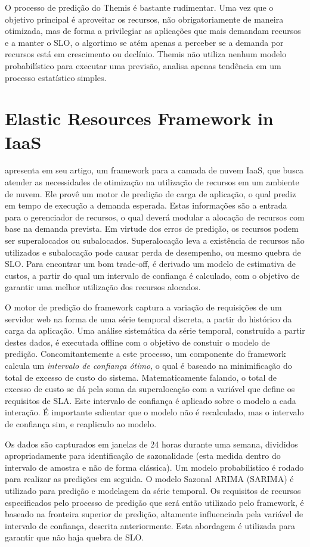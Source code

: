 \documentclass[twoside,english,brazilian]{UNISINOSmonografia}
\begin{document}
O processo de predição do Themis é bastante rudimentar. Uma vez que o objetivo principal é aproveitar os recursos, não obrigatoriamente de maneira otimizada, mas de forma a privilegiar as aplicações que mais demandam recursos e a manter o SLO, o algortimo se atém apenas a perceber se a demanda por recursos está em crescimento ou declínio. Themis não utiliza nenhum modelo probabilístico para executar uma previsão, analisa apenas tendência em um processo estatístico simples.


\section{Elastic Resources Framework in IaaS}
\cite{Dhingra2013} apresenta em seu artigo, um framework para a camada de nuvem IaaS, que busca atender as necessidades de otimização na utilização de recursos em um ambiente de nuvem. Ele provê um motor de predição de carga de aplicação, o qual prediz em tempo de execução a demanda esperada. Estas informações são a entrada para o gerenciador de recursos, o qual deverá modular a alocação de recursos com base na demanda prevista. Em virtude dos erros de predição, os recursos podem ser superalocados ou subalocados. Superalocação leva a existência de recursos não utilizados e subalocação pode causar perda de desempenho, ou mesmo quebra de SLO. Para encontrar um bom trade-off, é derivado um modelo de estimativa de custos, a partir do qual um intervalo de confiança é calculado, com o objetivo de garantir uma melhor utilização dos recursos alocados.

O motor de predição do framework captura a variação de requisições de um servidor web na forma de uma série temporal discreta, a partir do histórico da carga da aplicação. Uma análise sistemática da série temporal, construída a partir destes dados, é executada offline com o objetivo de constuir o modelo de predição. Concomitantemente a este processo, um componente do framework calcula um \textit{intervalo de confiança ótimo}, o qual é baseado na minimificação do total de excesso de custo do sistema. Matematicamente falando, o total de excesso de custo se dá pela soma da superalocação com a variável que define os requisitos de SLA. Este intervalo de confiança é aplicado sobre o modelo a cada interação. É importante salientar que o modelo não é recalculado, mas o intervalo de confiança sim, e reaplicado ao modelo. 

Os dados são capturados em janelas de 24 horas durante uma semana, divididos apropriadamente para identificação de sazonalidade (esta medida dentro do intervalo de amostra e não de forma clássica). Um modelo probabilístico é rodado para realizar as predições em seguida. O modelo Sazonal ARIMA (SARIMA) é utilizado para predição e modelagem da série temporal. Os requisitos de recursos especificados pelo processo de predição que será então utilizado pelo framework, é baseado na fronteira superior de predição, altamente influenciada pela variável de intervalo de confiança, descrita anteriormente. Esta abordagem é utilizada para garantir que não haja quebra de SLO.
\end{document}
